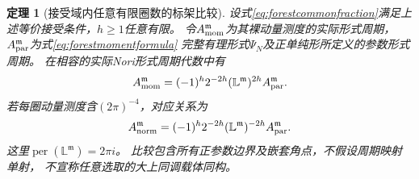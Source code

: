 \documentclass[11pt,a4paper]{ctexart}
\theoremstyle{cnplain}\newtheorem{theorem}{定理}[section]
\theoremstyle{definition}\newtheorem{definition}[theorem]{定义}
\theoremstyle{remark}\newtheorem{remark}[theorem]{注}
\begin{document}
\begin{theorem}[接受域内任意有限圈数的标架比较]
\label{thm:sectorformalcomparison}
设式\eqref{eq:forestcommonfraction}满足上述等价接受条件，$h\geq1$任意有限。
令$A_{\rm mom}^{\mathfrak m}$为其裸动量测度的实际形式周期，
$A_{\rm par}^{\mathfrak m}$为式\eqref{eq:forestmomentformula}
完整有理形式$\Psi_N$及正单纯形所定义的参数形式周期。
在相容的实际Nori形式周期代数中有
\begin{equation}
 A_{\rm mom}^{\mathfrak m}
 =(-1)^h2^{-2h}(\mathbb L^{\mathfrak m})^{2h}
 A_{\rm par}^{\mathfrak m}.
 \label{eq:sectorformalidentity}
\end{equation}
若每圈动量测度含$(2\pi)^{-4}$，对应关系为
\begin{equation}
 A_{\rm norm}^{\mathfrak m}
 =(-1)^h2^{-2h}(\mathbb L^{\mathfrak m})^{-2h}
 A_{\rm par}^{\mathfrak m}.
 \label{eq:sectornormalizedidentity}
\end{equation}
这里$\operatorname{per}(\mathbb L^{\mathfrak m})=2\pi i$。
比较包含所有正参数边界及嵌套角点，不假设周期映射单射，
不宣称任意选取的大上同调载体同构。
\end{theorem}
\end{document}
